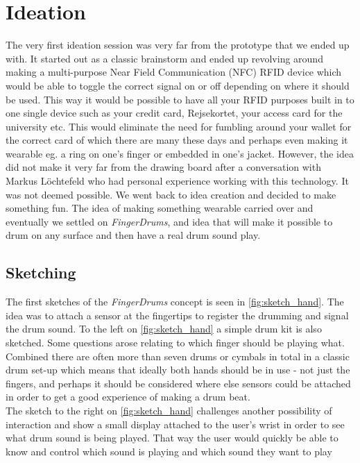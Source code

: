 \chapter{Ideation}
\label{Ideation}
The very first ideation session was very far from the prototype that we ended up with. It started out as a classic brainstorm and ended up revolving around making a multi-purpose Near Field Communication (NFC) RFID device which would be able to toggle the correct signal on or off depending on where it should be used. This way it would be possible to have all your RFID purposes built in to one single device such as your credit card, Rejsekortet, your access card for the university etc. This would eliminate the need for fumbling around your wallet for the correct card of which there are many these days and perhaps even making it wearable eg. a ring on one's finger or embedded in one's jacket. However, the idea did not make it very far from the drawing board after a conversation with Markus Löchtefeld who had personal experience working with this technology. It was not deemed possible. We went back to idea creation and decided to make something fun. The idea of making something wearable carried over and eventually we settled on \textit{FingerDrums}, and idea that will make it possible to drum on any surface and then have a real drum sound play. 



\section{Sketching}
The first sketches of the \textit{FingerDrums} concept is seen in \autoref{fig:sketch_hand}. The idea was to attach a sensor at the fingertips to register the drumming and signal the drum sound. To the left on \autoref{fig:sketch_hand} a simple drum kit is also  sketched. Some questions arose relating to which finger should be playing what. Combined there are often more than seven drums or cymbals in total in a classic drum set-up which means that ideally both hands should be in use - not just the fingers, and perhaps it should be considered where else sensors could be attached in order to get a good experience of making a drum beat.\\
The sketch to the right on \autoref{fig:sketch_hand} challenges another possibility of interaction and show a small display attached to the user's wrist in order to see what drum sound is being played. That way the user would quickly be able to know and control which sound is playing and which sound they want to play

